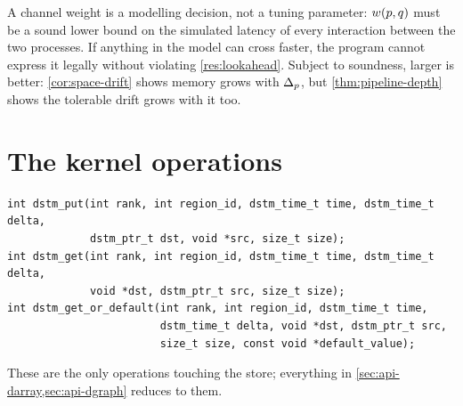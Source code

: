 \begin{remark}
A channel weight is a modelling decision, not a tuning parameter:
$w(p,q)$ must be a sound lower bound on the simulated latency of every
interaction between the two processes. If anything in the model can cross
faster, the program cannot express it legally without violating
\cref{res:lookahead}. Subject to soundness, larger is better:
\cref{cor:space-drift} shows memory grows with $\Delta_p$, but
\cref{thm:pipeline-depth} shows the tolerable drift grows with it too.
\end{remark}

\section{The kernel operations}
\label{sec:api-kernel}

\begin{lstlisting}
int dstm_put(int rank, int region_id, dstm_time_t time, dstm_time_t delta,
             dstm_ptr_t dst, void *src, size_t size);
int dstm_get(int rank, int region_id, dstm_time_t time, dstm_time_t delta,
             void *dst, dstm_ptr_t src, size_t size);
int dstm_get_or_default(int rank, int region_id, dstm_time_t time,
                        dstm_time_t delta, void *dst, dstm_ptr_t src,
                        size_t size, const void *default_value);
\end{lstlisting}

These are the only \glspl{operation} touching the \gls{store}; everything in
\cref{sec:api-darray,sec:api-dgraph} reduces to them.


